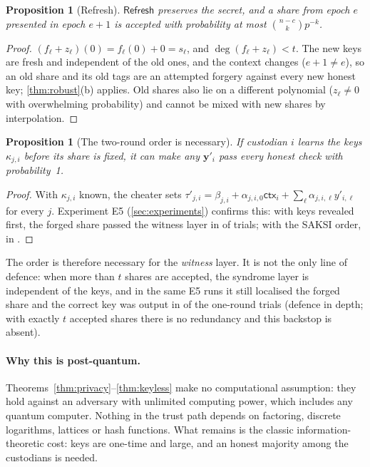 \documentclass[11pt,a4paper]{article}
\theoremstyle{plain}
\newtheorem{proposition}[theorem]{Proposition}
\theoremstyle{definition}
\newcommand{\ctx}{\mathsf{ctx}}
\begin{document}
\begin{proposition}[Refresh]\label{prop:refresh}
$\mathsf{Refresh}$ preserves the secret, and a share from epoch $e$ presented in epoch $e+1$ is
accepted with probability at most $\binom{n-c}{k}p^{-k}$.
\end{proposition}
\begin{proof}
$(f_\ell+z_\ell)(0)=f_\ell(0)+0=s_\ell$, and $\deg(f_\ell+z_\ell)<t$. The new keys are fresh and
independent of the old ones, and the context changes ($e+1\ne e$), so an old share and its old tags
are an attempted forgery against every new honest key; \cref{thm:robust}(b) applies. Old shares
also lie on a different polynomial ($z_\ell\ne0$ with overwhelming probability) and cannot be mixed
with new shares by interpolation.
\end{proof}

\begin{proposition}[The two-round order is necessary]\label{prop:order}
If custodian $i$ learns the keys $\kappa_{j,i}$ before its share is fixed, it can make any
$\mathbf y'_i$ pass every honest check with probability~1.
\end{proposition}
\begin{proof}
With $\kappa_{j,i}$ known, the cheater sets $\tau'_{j,i}=\beta_{j,i}+\alpha_{j,i,0}\ctx_i+
\sum_\ell\alpha_{j,i,\ell}y'_{i,\ell}$ for every $j$. Experiment E5 (\cref{sec:experiments})
confirms this: with keys revealed first, the forged share passed the witness layer in
\RushOneRound{} of \RushTrials{} trials; with the SAKSI order, in \RushTwoRound.
\end{proof}
The order is therefore necessary for the \emph{witness} layer. It is not the only line of defence:
when more than $t$ shares are accepted, the syndrome layer is independent of the keys, and in the
same E5 runs it still localised the forged share and the correct key was output in \RushSyndrome{}
of the one-round trials (defence in depth; with exactly $t$ accepted shares there is no redundancy
and this backstop is absent).

\paragraph{Why this is post-quantum.} Theorems~\ref{thm:privacy}--\ref{thm:keyless} make no
computational assumption: they hold against an adversary with unlimited computing power, which
includes any quantum computer. Nothing in the trust path depends on factoring, discrete
logarithms, lattices or hash functions. What remains is the classic information-theoretic cost:
keys are one-time and large, and an honest majority among the custodians is needed.
\end{document}
